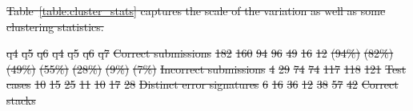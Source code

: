 \documentclass[12pt,twoside]{mitthesis}
\providecommand{\DIFdeltex}[1]{{\protect\color{red}\sout{#1}}}                      %
\providecommand{\DIFdelFL}[1]{\DIFdel{#1}} %
\providecommand{\DIFdel}[1]{\texorpdfstring{\DIFdeltex{#1}}{}} %
\begin{document}
{{{{{{{{{{%
\DIFdel{Table~\ref{table:cluster_stats} captures the scale of the variation as well as some clustering statistics.
}%

\DIFdelFL{q4 }%
\DIFdelFL{q5 }%
\DIFdelFL{q6 }%
\DIFdelFL{q4 }%
\DIFdelFL{q5 }%
\DIFdelFL{q6 }%
\DIFdelFL{q7 }%
\DIFdelFL{Correct submissions }%
\DIFdelFL{182 }%
\DIFdelFL{160 }%
\DIFdelFL{94 }%
\DIFdelFL{96 }%
\DIFdelFL{49 }%
\DIFdelFL{16 }%
\DIFdelFL{12 }%
\DIFdelFL{(94\%) }%
\DIFdelFL{(82\%) }%
\DIFdelFL{(49\%) }%
\DIFdelFL{(55\%) }%
\DIFdelFL{(28\%) }%
\DIFdelFL{(9\%) }%
\DIFdelFL{(7\%) }%
\DIFdelFL{Incorrect submissions }%
\DIFdelFL{4 }%
\DIFdelFL{29 }%
\DIFdelFL{74 }%
\DIFdelFL{74 }%
\DIFdelFL{117 }%
\DIFdelFL{118 }%
\DIFdelFL{121 }%
\DIFdelFL{Test cases }%
\DIFdelFL{10 }%
\DIFdelFL{15 }%
\DIFdelFL{25 }%
\DIFdelFL{11 }%
\DIFdelFL{10 }%
\DIFdelFL{17 }%
\DIFdelFL{28 }%
\DIFdelFL{Distinct error signatures }%
\DIFdelFL{6 }%
\DIFdelFL{16 }%
\DIFdelFL{36 }%
\DIFdelFL{12 }%
\DIFdelFL{38 }%
\DIFdelFL{57 }%
\DIFdelFL{42 }%
\DIFdelFL{Correct stacks }%
}}}}}}}}}}
\end{document}
